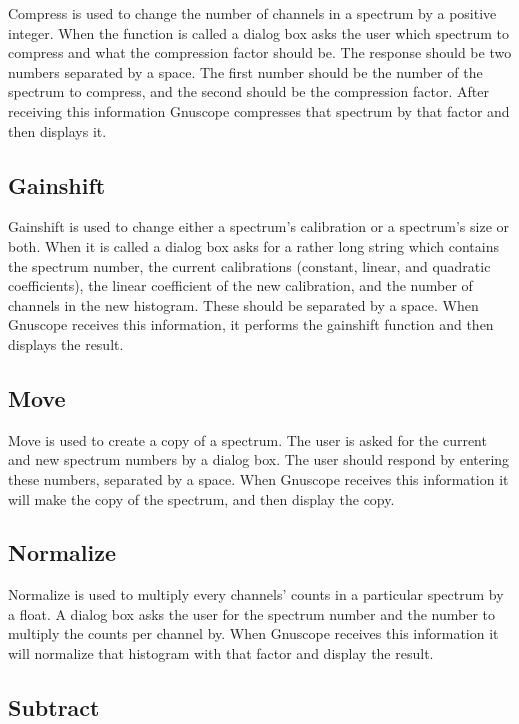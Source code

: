 Compress is used to change the number of channels in a spectrum by a positive integer.  When the function is called a dialog box asks the user which spectrum to compress and what the compression factor should be.  The response should be two numbers separated by a space.  The first number should be the number of the spectrum to compress, and the second should be the compression factor.  After receiving this information Gnuscope compresses that spectrum by that factor and then displays it.

\subsection{Gainshift}

Gainshift is used to change either a spectrum's calibration or a spectrum's size or both.  When it is called a dialog box asks for a rather long string which contains the spectrum number, the current calibrations (constant, linear, and quadratic coefficients), the linear coefficient of the new calibration, and the number of channels in the new histogram.  These should be separated by a space.  When Gnuscope receives this information, it performs the gainshift function and then displays the result.

\subsection{Move}

Move is used to create a copy of a spectrum.  The user is asked for the current and new spectrum numbers by a dialog box.  The user should respond by entering these numbers, separated by a space.  When Gnuscope receives this information it will make the copy of the spectrum, and then display the copy.

\subsection{Normalize}

Normalize is used to multiply every channels' counts in a particular spectrum by a float.  A dialog box asks the user for the spectrum number and the number to multiply the counts per channel by.  When Gnuscope receives this information it will normalize that histogram with that factor and display the result.

\subsection{Subtract}

